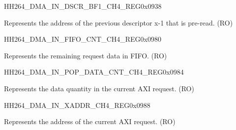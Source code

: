 \begin{register}{H}{H264\_DMA\_IN\_DSCR\_BF1\_CH4\_REG}{0x0938}\label{regdesc:H264DMAINDSCRBF1CH4REG}
%
\regnewline%
\begin{regdesc}\begin{reglist}
\label{fielddesc:H264DMAINLINKDSCRBF1CH4}\item [H264\_DMA\_INLINK\_DSCR\_BF1\_CH4] Represents the address of the previous descriptor x-1 that is pre-read. (RO)
\end{reglist}\end{regdesc}
\end{register}

\begin{register}{H}{H264\_DMA\_IN\_FIFO\_CNT\_CH4\_REG}{0x0980}\label{regdesc:H264DMAINFIFOCNTCH4REG}
%
%
\regnewline%
\begin{regdesc}\begin{reglist}
\label{fielddesc:H264DMAINCMDFIFOINFIFOCNTCH4}\item [H264\_DMA\_IN\_CMDFIFO\_INFIFO\_CNT\_CH4] Represents the remaining request data in FIFO. (RO)
\end{reglist}\end{regdesc}
\end{register}


\begin{register}{H}{H264\_DMA\_IN\_POP\_DATA\_CNT\_CH4\_REG}{0x0984}\label{regdesc:H264DMAINPOPDATACNTCH4REG}
%
%
\regnewline%
\begin{regdesc}\begin{reglist}
\label{fielddesc:H264DMAINCMDFIFOPOPDATACNTCH4}\item [H264\_DMA\_IN\_CMDFIFO\_POP\_DATA\_CNT\_CH4] Represents the data quantity in the current AXI request. (RO)
\end{reglist}\end{regdesc}
\end{register}


\begin{register}{H}{H264\_DMA\_IN\_XADDR\_CH4\_REG}{0x0988}\label{regdesc:H264DMAINXADDRCH4REG}
%
\regnewline%
\begin{regdesc}\begin{reglist}
\label{fielddesc:H264DMAINCMDFIFOXADDRCH4}\item [H264\_DMA\_IN\_CMDFIFO\_XADDR\_CH4] Represents the address of the current AXI request. (RO)
\end{reglist}\end{regdesc}
\end{register}


